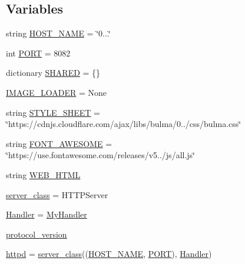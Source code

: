 \subsection*{Variables}
\begin{DoxyCompactItemize}
\item 
string \hyperlink{namespaceprojects_1_1image__chat_1_1interactive_a1df80199d9d5b60b54e81b9c44875ccc}{H\+O\+S\+T\+\_\+\+N\+A\+ME} = \char`\"{}0...\char`\"{}
\item 
int \hyperlink{namespaceprojects_1_1image__chat_1_1interactive_a12cbe03ae0e3fed978a6bb951c35622b}{P\+O\+RT} = 8082
\item 
dictionary \hyperlink{namespaceprojects_1_1image__chat_1_1interactive_a3971e7bf1ad5c62754fccbb32fa1262b}{S\+H\+A\+R\+ED} = \{\}
\item 
\hyperlink{namespaceprojects_1_1image__chat_1_1interactive_a5e49658669731b75d6a0de3f1d29bd7e}{I\+M\+A\+G\+E\+\_\+\+L\+O\+A\+D\+ER} = None
\item 
string \hyperlink{namespaceprojects_1_1image__chat_1_1interactive_a1b99b03264c4af3bb98437e25d4bb491}{S\+T\+Y\+L\+E\+\_\+\+S\+H\+E\+ET} = \char`\"{}https\+://cdnjs.\+cloudflare.\+com/ajax/libs/bulma/0../css/bulma.\+css\char`\"{}
\item 
string \hyperlink{namespaceprojects_1_1image__chat_1_1interactive_ad1ce0a55f3bef720e908bb40add73509}{F\+O\+N\+T\+\_\+\+A\+W\+E\+S\+O\+ME} = \char`\"{}https\+://use.\+fontawesome.\+com/releases/v5../js/all.\+js\char`\"{}
\item 
string \hyperlink{namespaceprojects_1_1image__chat_1_1interactive_a78b3071d458d6b6828472f86ea6f7718}{W\+E\+B\+\_\+\+H\+T\+ML}
\item 
\hyperlink{namespaceprojects_1_1image__chat_1_1interactive_a54b092d0eb15cb8decf78688b1a6fe6d}{server\+\_\+class} = H\+T\+T\+P\+Server
\item 
\hyperlink{namespaceprojects_1_1image__chat_1_1interactive_ac51164d011818446d45924028cd6183f}{Handler} = \hyperlink{classprojects_1_1image__chat_1_1interactive_1_1MyHandler}{My\+Handler}
\item 
\hyperlink{namespaceprojects_1_1image__chat_1_1interactive_a24d446284e43e25d167faf0949848249}{protocol\+\_\+version}
\item 
\hyperlink{namespaceprojects_1_1image__chat_1_1interactive_a2c0d464fafcbcedd9b56aaf2a253e6ca}{httpd} = \hyperlink{namespaceprojects_1_1image__chat_1_1interactive_a54b092d0eb15cb8decf78688b1a6fe6d}{server\+\_\+class}((\hyperlink{namespaceprojects_1_1image__chat_1_1interactive_a1df80199d9d5b60b54e81b9c44875ccc}{H\+O\+S\+T\+\_\+\+N\+A\+ME}, \hyperlink{namespaceprojects_1_1image__chat_1_1interactive_a12cbe03ae0e3fed978a6bb951c35622b}{P\+O\+RT}), \hyperlink{namespaceprojects_1_1image__chat_1_1interactive_ac51164d011818446d45924028cd6183f}{Handler})
\end{DoxyCompactItemize}


